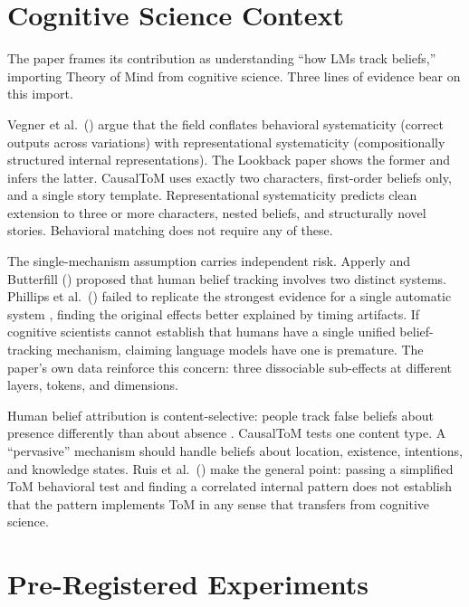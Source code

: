 \documentclass[11pt]{article}
\begin{document}
\section{Cognitive Science Context}
\label{sec:cogsci}

The paper frames its contribution as understanding ``how LMs track beliefs,'' importing Theory of Mind from cognitive science. Three lines of evidence bear on this import.

Vegner et al.\ (\citeyear{vegner2025systematicity}) argue that the field conflates behavioral systematicity (correct outputs across variations) with representational systematicity (compositionally structured internal representations). The Lookback paper shows the former and infers the latter. CausalToM uses exactly two characters, first-order beliefs only, and a single story template. Representational systematicity predicts clean extension to three or more characters, nested beliefs, and structurally novel stories. Behavioral matching does not require any of these.

The single-mechanism assumption carries independent risk. Apperly and Butterfill (\citeyear{apperly2009humans}) proposed that human belief tracking involves two distinct systems. Phillips et al.\ (\citeyear{phillips2015second}) failed to replicate the strongest evidence for a single automatic system \citep{kovacs2010social}, finding the original effects better explained by timing artifacts. If cognitive scientists cannot establish that humans have a single unified belief-tracking mechanism, claiming language models have one is premature. The paper's own data reinforce this concern: three dissociable sub-effects at different layers, tokens, and dimensions.

Human belief attribution is content-selective: people track false beliefs about presence differently than about absence \citep{schuwerk2015implicit}. CausalToM tests one content type. A ``pervasive'' mechanism should handle beliefs about location, existence, intentions, and knowledge states. Ruis et al.\ (\citeyear{ruis2025reevaluating}) make the general point: passing a simplified ToM behavioral test and finding a correlated internal pattern does not establish that the pattern implements ToM in any sense that transfers from cognitive science.


\section{Pre-Registered Experiments}
\label{sec:experiments}
\end{document}
